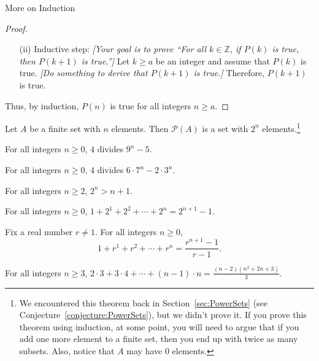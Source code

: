 \begin{section}{More on Induction}
\begin{skeleton}
\begin{center}
{\begin{minipage}{6in}
\begin{proof}
\begin{enumerate}
\item[(ii)] Inductive step:  \emph{[Your goal is to prove ``For all $k\in\mathbb{Z}$, if $P(k)$ is true, then $P(k+1)$ is true.'']} Let $k \ge a$ be an integer and assume that $P(k)$ is true. \emph{[Do something to derive that $P(k+1)$ is true.]} Therefore, $P(k+1)$ is true.
\end{enumerate}
Thus, by induction, $P(n)$ is true for all integers $n \ge a$.
\end{proof}
\end{minipage}
}
\end{center}
\end{skeleton}

\begin{theorem}
Let $A$ be a finite set with $n$ elements.  Then $\mathcal{P}(A)$ is a set with $2^{n}$ elements.\footnote{We encountered this theorem back in Section~\ref{sec:PowerSets} (see Conjecture~\ref{conjecture:PowerSets}), but we didn't prove it. If you prove this theorem using induction, at some point, you will need to argue that if you add one more element to a finite set, then you end up with twice as many subsets. Also, notice that $A$ may have 0 elements.}
\end{theorem}

\begin{theorem}
For all integers $n \ge 0$, $4$ divides $9^n - 5$.
\end{theorem}

\begin{theorem}
For all integers $n \ge 0$, $4$ divides $6\cdot 7^n - 2 \cdot 3^n$.
\end{theorem}

\begin{theorem}
For all integers $n \ge 2$, $2^n > n + 1$.
\end{theorem}

\begin{theorem}
For all integers $n \ge 0$, $1 + 2^1 + 2^2 + \cdots + 2^n = 2^{n+1} - 1$.
\end{theorem}

\begin{theorem}
Fix a real number $r \neq 1$. For all integers $n \ge 0$,
$$\displaystyle{1 + r^1 + r^2 + \cdots + r^n = \frac{r^{n+1} - 1}{r-1}}.$$
\end{theorem}

\begin{theorem}
For all integers $n \ge 3$, $\displaystyle{2\cdot 3 + 3 \cdot 4 + \cdots + (n-1)\cdot n = \frac{(n-2)(n^2+2n+3)}{3}}$.
\end{theorem}


\end{section}
